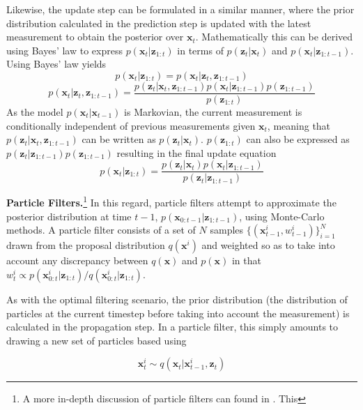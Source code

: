 \documentclass[letterpaper, 10 pt, conference]{ieeeconf}
\renewcommand{\vec}[1]{\boldsymbol{#1}}
\begin{document}
Likewise, the update step can be formulated in a similar manner, where the prior distribution calculated in the prediction step is updated with the latest measurement to obtain the posterior over $\vec{x}_t$. Mathematically this can be derived using Bayes' law to express $p(\vec{x}_t|\vec{z}_{1:t})$ in terms of $p(\vec{z}_t|\vec{x}_t)$ and $p(\vec{x}_t|\vec{z}_{1:t-1})$. Using Bayes' law yields
\begin{equation*}
	p(\vec{x}_t|\vec{z}_{1:t}) = p(\vec{x}_t|\vec{z}_t,\vec{z}_{1:t-1})
\end{equation*}
\begin{equation*}
p(\vec{x}_t|\vec{z}_t,\vec{z}_{1:t-1}) = \frac{p(\vec{z}_t|\vec{x}_t, \vec{z}_{1:t-1})p(\vec{x}_t|\vec{z}_{1:t-1})p(\vec{z}_{1:t-1})}{p(\vec{z}_{1:t})}
\end{equation*}
As the model $p(\vec{x}_t|\vec{x}_{t-1})$ is Markovian, the current measurement is conditionally independent of previous measurements given $\vec{x}_t$, meaning that $p(\vec{z}_{t}|\vec{x}_t, \vec{z}_{1:t-1})$ can be written as $p(\vec{z}_t|\vec{x}_t)$. $p(\vec{z}_{1:t})$ can also be expressed as $p(\vec{z}_t|\vec{z}_{1:t-1})p(\vec{z}_{1:t-1})$ resulting in the final update equation \citep{ParticleNotes}
\begin{equation} \label{eq:update}
	p(\vec{x}_t|\vec{z}_{1:t}) = \frac{p(\vec{z}_{t}|\vec{x}_t)p(\vec{x}_{t}|\vec{z}_{1:t-1})}{p(\vec{z}_t|\vec{z}_{1:t-1})}
\end{equation}


\textbf{Particle Filters.}\footnote{A more in-depth discussion of particle filters can found in . This } In this regard, particle filters attempt to approximate the posterior distribution at time $t-1$, $p(\vec{x}_{0:t-1}|\vec{z}_{1:t-1})$, using Monte-Carlo methods. A particle filter consists of a set of $N$ samples $\{ (\vec{x}^i_{t-1}, w^i_{t-1}) \}_{i=1}^N$ drawn from the proposal distribution $q(\vec{x}^i)$ and weighted so as to take into account any discrepancy between $q(\vec{x})$ and $p(\vec{x})$ in that $w^i_t \propto p(\vec{x}^i_{0:t}|\vec{z}_{1:t})/q(\vec{x}^i_{0:t}|\vec{z}_{1:t})$.

As with the optimal filtering scenario, the prior distribution (the distribution of particles at the current timestep before taking into account the measurement) is calculated in the propagation step. In a particle filter, this simply amounts to drawing a new set of particles based using

\begin{equation} \label{eq:propagate_particles}
	\vec{x}^i_t \sim q(\vec{x}_t|\vec{x}^i_{t-1}, \vec{z}_t)
\end{equation}
\end{document}
